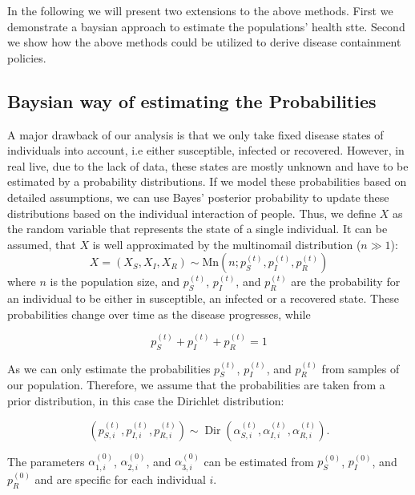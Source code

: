 
In the following we will present two extensions to the above methods.
First we demonstrate a baysian approach to estimate the populations' health stte.
Second we show how the above methods could be utilized to derive disease containment policies.

\subsection{Baysian way of estimating the Probabilities}

A major drawback of our analysis is that we only take fixed disease states of individuals into account, i.e either susceptible, infected or recovered. However, in real live, due to the lack of data, these states are mostly unknown and have to be estimated by a probability distributions. If we model these probabilities based on detailed assumptions, we can use Bayes' posterior probability to update these distributions based on the individual interaction of people. Thus, we define $X$ as the random variable that represents the state of a single individual. It can be assumed, that $X$ is well approximated by the multinomail distribution ($n\gg1$):
\begin{equation}
    X = \left(X_{S}, X_{I}, X_{R}\right) \sim \text{Mn}(n;p_S^{(t)},p_I^{(t)},p_R^{(t)})
\end{equation}
where $n$ is the population size, and $p_S^{(t)}$, $p_I^{(t)}$, and $p_R^{(t)}$ are the probability for an individual to be either in susceptible, an infected or a recovered state. These probabilities change over time as the disease progresses, while

\begin{equation}
    p_S^{(t)}+p_I^{(t)}+p_R^{(t)}=1
\end{equation}

As we can only estimate the probabilities $p_S^{(t)}$, $p_I^{(t)}$, and $p_R^{(t)}$ from samples of our population. Therefore, we assume that the probabilities are taken from a prior distribution, in this case the Dirichlet distribution:

\begin{equation}
    \left(p_{S,i}^{(t)}, p_{I,i}^{(t)}, p_{R,i}^{(t)}\right) \sim \operatorname{Dir}\left(\alpha_{S,i}^{(t)}, \alpha_{I,i}^{(t)}, \alpha_{R,i}^{(t)}\right).
\end{equation}

The parameters $\alpha_{1,i}^{(0)}$, $\alpha_{2,i}^{(0)}$, and $\alpha_{3,i}^{(0)}$ can be estimated from $p_S^{(0)}$, $p_I^{(0)}$, and $p_R^{(0)}$ and are specific for each individual $i$.

